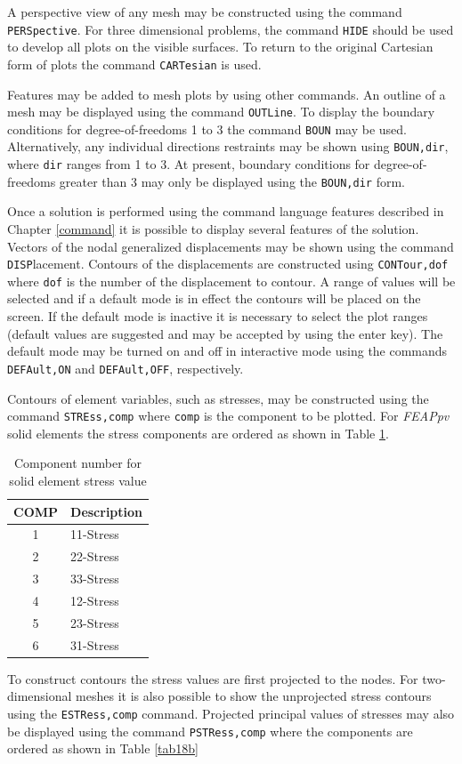 A perspective view of any mesh may be constructed using the command
{\tt PERSpective}.  For three dimensional problems, the command {\tt HIDE}
should be used to develop all plots on the visible surfaces.  To return to
the original Cartesian form of plots the command {\tt CARTesian} is used.

Features may be added to mesh plots by using other commands.
An outline of a mesh may be displayed using the command {\tt OUTLine}.
To display the
boundary conditions for degree-of-freedoms 1 to 3 the command {\tt BOUN}
may be used.  Alternatively, any individual directions restraints may be
shown using {\tt BOUN,dir}, where {\tt dir} ranges from 1 to 3.  At present,
boundary conditions for degree-of-freedoms greater than 3 may only be displayed
using the \texttt{BOUN,dir} form.

Once a solution is performed using the command language features described
in Chapter \ref{command} it is possible to display several features of
the solution.  Vectors of the nodal generalized displacements may be shown
using the command {\tt DISP}lacement.  Contours of the displacements are
constructed using {\tt CONTour,dof} where {\tt dof} is the number of the
displacement to contour.  A range of values will be selected and if a
default mode is in effect the contours will be placed on the screen.  If
the default mode is inactive it is necessary to select the plot ranges (default
values are suggested and may be accepted by using the enter key).  The
default mode may be turned on and off in interactive mode using the
commands {\tt DEFAult,ON} and {\tt DEFAult,OFF}, respectively.

Contours of element variables, such as stresses, may be constructed using
the command {\tt STREss,comp} where {\tt comp} is the component to be plotted.
For {\sl FEAPpv} solid elements the stress components are ordered as shown in
Table \ref{tab18a}.

\begin{table}
\begin{center}
\begin{tabular}{| c | l |} \hline
COMP & Description \\ \hline
1 & 11-Stress \\
2 & 22-Stress \\
3 & 33-Stress \\
4 & 12-Stress \\
5 & 23-Stress \\
6 & 31-Stress \\ \hline
\end{tabular}
\caption{Component number for solid element stress value}
\label{tab18a}
\end{center}
\end{table}
To construct contours the stress values are first projected to the nodes.
For two-di\-men\-sion\-al meshes it is also possible to show the unprojected
stress contours using the {\tt ESTRess,comp} command.
Projected principal values of stresses
may also be displayed using the command {\tt PSTRess,comp}
where the components are ordered as shown in Table \ref{tab18b}

